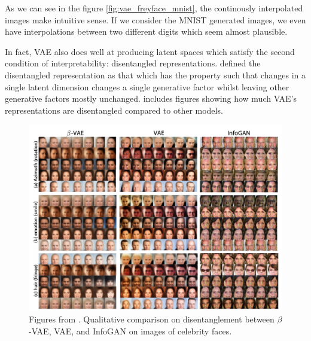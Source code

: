             As we can see in the figure \ref{fig:vae_freyface_mnist}, the continously interpolated images make intuitive sense. If we consider the MNIST generated images, we even have interpolations between two different digits which seem almost plausible.
            
            In fact, VAE also does well at producing latent spaces which satisfy the second condition of interpretability: disentangled representations. \cite{bengio2013representation} defined the disentangled representation as that which has the property such that changes in a single latent dimension changes a single generative factor whilst leaving other generative factors mostly unchanged. \cite{higgins2017beta} includes figures showing how much VAE's representations are disentangled compared to other models.
            
            \begin{figure}[H]
                \centering
                \includegraphics[width=1\textwidth]{imgs/celeba.png}
                \caption{Figures from \cite{higgins2017beta}. Qualitative comparison on disentanglement between $\beta$-VAE\citep{higgins2017beta}, VAE\citep{kingma2014adam}, and InfoGAN\citep{chen2016infogan} on images of celebrity faces.}
                \label{fig:celeba}
            \end{figure}    
            
